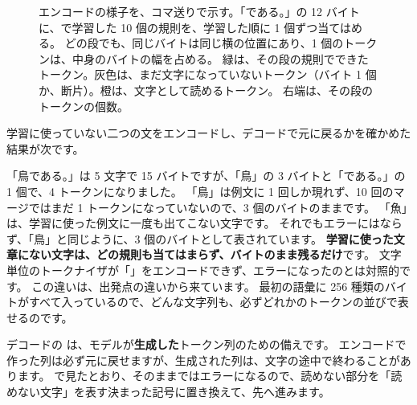 \begin{figure}[tbp]
\caption{エンコードの様子を、コマ送りで示す。「である。」の 12 バイトに、で学習した 10 個の規則を、学習した順に 1 個ずつ当てはめる。
どの段でも、同じバイトは同じ横の位置にあり、1 個のトークンは、中身のバイトの幅を占める。
緑は、その段の規則でできたトークン。灰色は、まだ文字になっていないトークン（バイト 1 個か、断片）。橙は、文字として読めるトークン。
右端は、その段のトークンの個数。}
\label{fig:tok-encode}
\end{figure}

学習に使っていない二つの文をエンコードし、デコードで元に戻るかを確かめた結果が次です。


「鳥である。」は 5 文字で 15 バイトですが、「鳥」の 3 バイトと「である。」の 1 個で、4 トークンになりました。
「鳥」は例文に 1 回しか現れず、10 回のマージではまだ 1 トークンになっていないので、3 個のバイトのままです。
「魚」は、学習に使った例文に一度も出てこない文字です。
それでもエラーにはならず、「鳥」と同じように、3 個のバイトとして表されています。
\textbf{学習に使った文章にない文字は、どの規則も当てはまらず、バイトのまま残るだけ}です。
文字単位のトークナイザが「\code{+}」をエンコードできず、エラーになったのとは対照的です。
この違いは、出発点の違いから来ています。
最初の語彙に 256 種類のバイトがすべて入っているので、どんな文字列も、必ずどれかのトークンの並びで表せるのです。

デコードの  は、モデルが\textbf{生成した}トークン列のための備えです。
エンコードで作った列は必ず元に戻せますが、生成された列は、文字の途中で終わることがあります。
で見たとおり、そのままではエラーになるので、読めない部分を「読めない文字」を表す決まった記号に置き換えて、先へ進みます。

